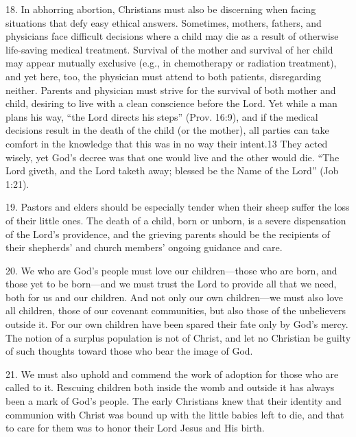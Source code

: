 \documentclass[
]{book}
\begin{document}
\protect\hypertarget{dda-statement-18}{\href{}{}}18. In abhorring abortion, Christians must also be discerning when facing situations that defy easy ethical answers. Sometimes, mothers, fathers, and physicians face difficult decisions where a child may die as a result of otherwise life-saving medical treatment. Survival of the mother and survival of her child may appear mutually exclusive (e.g., in chemotherapy or radiation treatment), and yet here, too, the physician must attend to both patients, disregarding neither. Parents and physician must strive for the survival of both mother and child, desiring to live with a clean conscience before the Lord. Yet while a man plans his way, ``the Lord directs his steps'' (Prov. 16:9), and if the medical decisions result in the death of the child (or the mother), all parties can take comfort in the knowledge that this was in no way their intent.13 They acted wisely, yet God's decree was that one would live and the other would die. ``The Lord giveth, and the Lord taketh away; blessed be the Name of the Lord'' (Job 1:21).

\protect\hypertarget{dda-statement-19}{\href{}{}}19. Pastors and elders should be especially tender when their sheep suffer the loss of their little ones. The death of a child, born or unborn, is a severe dispensation of the Lord's providence, and the grieving parents should be the recipients of their shepherds' and church members' ongoing guidance and care.

\protect\hypertarget{dda-statement-20}{\href{}{}}20. We who are God's people must love our children---those who are born, and those yet to be born---and we must trust the Lord to provide all that we need, both for us and our children. And not only our own children---we must also love all children, those of our covenant communities, but also those of the unbelievers outside it. For our own children have been spared their fate only by God's mercy. The notion of a surplus population is not of Christ, and let no Christian be guilty of such thoughts toward those who bear the image of God.

\protect\hypertarget{dda-statement-21}{\href{}{}}21. We must also uphold and commend the work of adoption for those who are called to it. Rescuing children both inside the womb and outside it has always been a mark of God's people. The early Christians knew that their identity and communion with Christ was bound up with the little babies left to die, and that to care for them was to honor their Lord Jesus and His birth.
\end{document}
